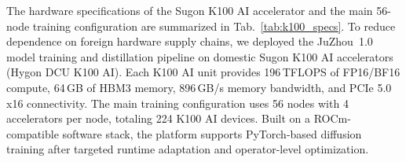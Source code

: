 The hardware specifications of the Sugon K100 AI accelerator and the main 56-node training configuration are summarized in Tab.~\ref{tab:k100_specs}. To reduce dependence on foreign hardware supply chains, we deployed the JuZhou~1.0 model training and distillation pipeline on domestic Sugon K100 AI accelerators (Hygon DCU K100 AI). Each K100 AI unit provides 196\,TFLOPS of FP16/BF16 compute, 64\,GB of HBM3 memory, 896\,GB/s memory bandwidth, and PCIe 5.0 x16 connectivity. The main training configuration uses 56 nodes with 4 accelerators per node, totaling 224 K100 AI devices. Built on a ROCm-compatible software stack, the platform supports PyTorch-based diffusion training after targeted runtime adaptation and operator-level optimization.


